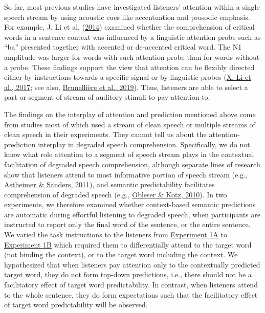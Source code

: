 \documentclass[a4paper, nobind]{templates/ociamthesis}
\begin{document}
So far, most previous studies have investigated listeners' attention within a single speech stream by using acoustic cues like accentuation and prosodic emphasis.
For example, J. Li et al. (\protect\hyperlink{ref-Li2014}{2014}) examined whether the comprehension of critical words in a sentence context was influenced by a linguistic attention probe such as ``ba'' presented together with accented or de-accented critical word.
The N1 amplitude was larger for words with such attention probe than for words without a probe.
These findings support the view that attention can be flexibly directed either by instructions towards a specific signal or by linguistic probes (\protect\hyperlink{ref-Li2017}{X. Li et al., 2017}; see also, \protect\hyperlink{ref-Brunelliere2019}{Brunellière et al., 2019}).
Thus, listeners are able to select a part or segment of stream of auditory stimuli to pay attention to.

The findings on the interplay of attention and prediction mentioned above come from studies most of which used a stream of clean speech or multiple streams of clean speech in their experiments.
They cannot tell us about the attention-prediction interplay in degraded speech comprehension.
Specifically, we do not know what role attention to a segment of speech stream plays in the contextual facilitation of degraded speech comprehension,
although separate lines of research show that listeners attend to most informative portion of speech stream (e.g., \protect\hyperlink{ref-Astheimer2011}{Astheimer \& Sanders, 2011}), and semantic predictability facilitates comprehension of degraded speech (e.g., \protect\hyperlink{ref-Obleser2010}{Obleser \& Kotz, 2010}).
In two experiments, we therefore examined whether context-based semantic predictions are automatic during effortful listening to degraded speech, when participants are instructed to report only the final word of the sentence, or the entire sentence.
We varied the task instructions to the listeners from \protect\hyperlink{experiment1a}{Experiment 1A} to \protect\hyperlink{experiment1b}{Experiment 1B} which required them to differentially attend to the target word (not binding the context), or to the target word including the context.
We hypothesized that when listeners pay attention only to the contextually predicted target word, they do not form top-down predictions, i.e., there should not be a facilitatory effect of target word predictability.
In contrast, when listeners attend to the whole sentence, they do form expectations such that the facilitatory effect of target word predictability will be observed.
\end{document}

